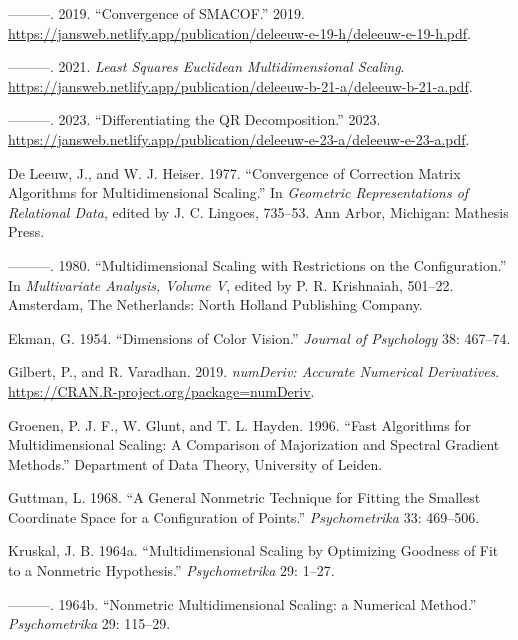 \documentclass[
  12pt,
  letterpaper,
  DIV=11,
  numbers=noendperiod]{scrartcl}
\newlength{\cslhangindent}
\newenvironment{CSLReferences}[2] %
 {\begin{list}{}{%
  \setlength{\itemindent}{0pt}
  \setlength{\leftmargin}{0pt}
  \setlength{\parsep}{0pt}
  \ifodd #1
   \setlength{\leftmargin}{\cslhangindent}
   \setlength{\itemindent}{-1\cslhangindent}
  \fi
  \setlength{\itemsep}{#2\baselineskip}}}
 {\end{list}}
\begin{document}
\begin{CSLReferences}{1}{0}
---------. 2019. {``{Convergence of SMACOF}.''} 2019.
\url{https://jansweb.netlify.app/publication/deleeuw-e-19-h/deleeuw-e-19-h.pdf}.

---------. 2021. \emph{Least Squares Euclidean Multidimensional
Scaling}.
\url{https://jansweb.netlify.app/publication/deleeuw-b-21-a/deleeuw-b-21-a.pdf}.

---------. 2023. {``Differentiating the QR Decomposition.''} 2023.
\url{https://jansweb.netlify.app/publication/deleeuw-e-23-a/deleeuw-e-23-a.pdf}.

De Leeuw, J., and W. J. Heiser. 1977. {``Convergence of Correction
Matrix Algorithms for Multidimensional Scaling.''} In \emph{Geometric
Representations of Relational Data}, edited by J. C. Lingoes, 735--53.
Ann Arbor, Michigan: Mathesis Press.

---------. 1980. {``Multidimensional Scaling with Restrictions on the
Configuration.''} In \emph{Multivariate Analysis, Volume {V}}, edited by
P. R. Krishnaiah, 501--22. Amsterdam, The Netherlands: North Holland
Publishing Company.

Ekman, G. 1954. {``{Dimensions of Color Vision}.''} \emph{Journal of
Psychology} 38: 467--74.

Gilbert, P., and R. Varadhan. 2019. \emph{{numDeriv: Accurate Numerical
Derivatives}}. \url{https://CRAN.R-project.org/package=numDeriv}.

Groenen, P. J. F., W. Glunt, and T. L. Hayden. 1996. {``Fast Algorithms
for Multidimensional Scaling: A Comparison of Majorization and Spectral
Gradient Methods.''} Department of Data Theory, University of Leiden.

Guttman, L. 1968. {``{A General Nonmetric Technique for Fitting the
Smallest Coordinate Space for a Configuration of Points}.''}
\emph{Psychometrika} 33: 469--506.

Kruskal, J. B. 1964a. {``{Multidimensional Scaling by Optimizing
Goodness of Fit to a Nonmetric Hypothesis}.''} \emph{Psychometrika} 29:
1--27.

---------. 1964b. {``{Nonmetric Multidimensional Scaling: a Numerical
Method}.''} \emph{Psychometrika} 29: 115--29.


\end{CSLReferences}
\end{document}
